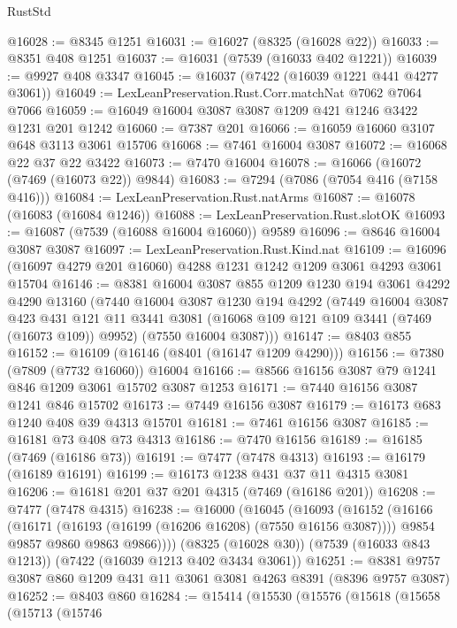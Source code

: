 \begin{lexlean}{RustStd}
\begin{coremodule}
@16028 := @8345 @1251
@16031 := @16027 (@8325 (@16028 @22))
@16033 := @8351 @408 @1251
@16037 := @16031 (@7539 (@16033 @402 @1221))
@16039 := @9927 @408 @3347
@16045 := @16037 (@7422 (@16039 @1221 @441 @4277 @3061))
@16049 := LexLeanPreservation.Rust.Corr.matchNat @7062 @7064 @7066
@16059 := @16049 @16004 @3087 @3087 @1209 @421 @1246 @3422 @1231 @201 @1242
@16060 := @7387 @201
@16066 := @16059 @16060 @3107 @648 @3113 @3061 @15706
@16068 := @7461 @16004 @3087
@16072 := @16068 @22 @37 @22 @3422
@16073 := @7470 @16004
@16078 := @16066 (@16072 (@7469 (@16073 @22)) @9844)
@16083 := @7294 (@7086 (@7054 @416 (@7158 @416)))
@16084 := LexLeanPreservation.Rust.natArms
@16087 := @16078 (@16083 (@16084 @1246))
@16088 := LexLeanPreservation.Rust.slotOK
@16093 := @16087 (@7539 (@16088 @16004 @16060)) @9589
@16096 := @8646 @16004 @3087 @3087
@16097 := LexLeanPreservation.Rust.Kind.nat
@16109 := @16096 (@16097 @4279 @201 @16060) @4288 @1231 @1242 @1209 @3061 @4293 @3061 @15704
@16146 := @8381
    @16004
    @3087
    @855
    @1209
    @1230
    @194
    @3061
    @4292
    @4290
    @13160
    (@7440
      @16004
      @3087
      @1230
      @194
      @4292
      (@7449
        @16004
        @3087
        @423
        @431
        @121
        @11
        @3441
        @3081
        (@16068 @109 @121 @109 @3441 (@7469 (@16073 @109)) @9952)
        (@7550 @16004 @3087)))
@16147 := @8403 @855
@16152 := @16109 (@16146 (@8401 (@16147 @1209 @4290)))
@16156 := @7380 (@7809 (@7732 @16060)) @16004
@16166 := @8566 @16156 @3087 @79 @1241 @846 @1209 @3061 @15702 @3087 @1253
@16171 := @7440 @16156 @3087 @1241 @846 @15702
@16173 := @7449 @16156 @3087
@16179 := @16173 @683 @1240 @408 @39 @4313 @15701
@16181 := @7461 @16156 @3087
@16185 := @16181 @73 @408 @73 @4313
@16186 := @7470 @16156
@16189 := @16185 (@7469 (@16186 @73))
@16191 := @7477 (@7478 @4313)
@16193 := @16179 (@16189 @16191)
@16199 := @16173 @1238 @431 @37 @11 @4315 @3081
@16206 := @16181 @201 @37 @201 @4315 (@7469 (@16186 @201))
@16208 := @7477 (@7478 @4315)
@16238 := @16000
    (@16045
      (@16093
        (@16152
          (@16166
            (@16171 (@16193 (@16199 (@16206 @16208) (@7550 @16156 @3087))))
            @9854
            @9857
            @9860
            @9863
            @9866))))
    (@8325 (@16028 @30))
    (@7539 (@16033 @843 @1213))
    (@7422 (@16039 @1213 @402 @3434 @3061))
@16251 := @8381 @9757 @3087 @860 @1209 @431 @11 @3061 @3081 @4263 @8391 (@8396 @9757 @3087)
@16252 := @8403 @860
@16284 := @15414
    (@15530
      (@15576
        (@15618
          (@15658
            (@15713
              (@15746

\end{coremodule}
\end{lexlean}
